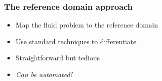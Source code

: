 \begin{frame}
  \frametitle{The reference domain approach}

  \begin{figure}[htbp]
  \centering
  \def\svgwidth{0.3\columnwidth}
  
\end{figure}
  
  \begin{itemize}
  \item<1->
    Map the fluid problem to the reference domain
  \item<2->
    Use standard techniques to differentiate
  \item<3->
    Straightforward but tedious
  \item<4->
    \emph{Can be automated!}
  \end{itemize}
\end{frame}
